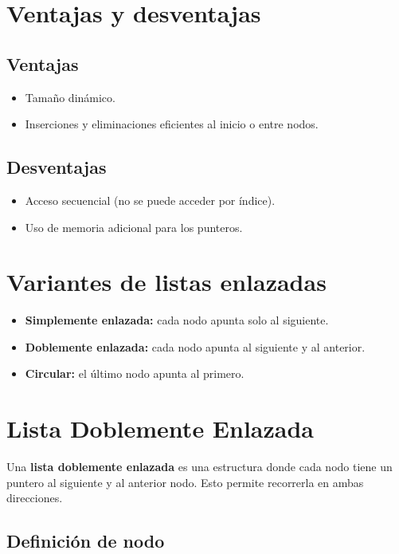\documentclass[a4paper]{article}
\begin{document}
\section{Ventajas y desventajas}

\subsection*{Ventajas}
\begin{itemize}
    \item Tamaño dinámico.
    \item Inserciones y eliminaciones eficientes al inicio o entre nodos.
\end{itemize}

\subsection*{Desventajas}
\begin{itemize}
    \item Acceso secuencial (no se puede acceder por índice).
    \item Uso de memoria adicional para los punteros.
\end{itemize}

\section{Variantes de listas enlazadas}

\begin{itemize}
    \item \textbf{Simplemente enlazada:} cada nodo apunta solo al siguiente.
    \item \textbf{Doblemente enlazada:} cada nodo apunta al siguiente y al anterior.
    \item \textbf{Circular:} el último nodo apunta al primero.
\end{itemize}
\newpage
\section{Lista Doblemente Enlazada}

Una \textbf{lista doblemente enlazada} es una estructura donde cada nodo tiene un puntero al siguiente y al anterior nodo. Esto permite recorrerla en ambas direcciones.

\subsection*{Definición de nodo}
\end{document}
